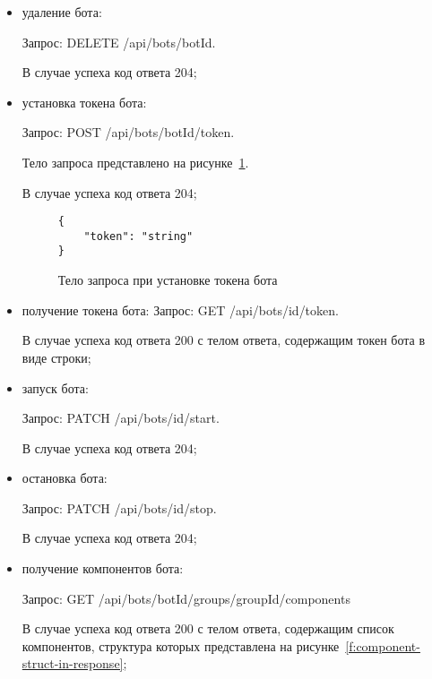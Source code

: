 \begin{itemize}
	\item удаление бота:

	      Запрос: DELETE /api/bots/{botId}.

	      В случае успеха код ответа 204;

	\item установка токена бота:

	      Запрос: POST /api/bots/{botId}/token.

	      Тело запроса представлено на рисунке~\ref{f:set-token-request-body}.

	      В случае успеха код ответа 204;


	      \begin{figure}[ht]
		      \centering
		      \vspace{\toppaddingoffigure}
		      \begin{lstlisting}
{
    "token": "string"
}
    \end{lstlisting}
		      \caption{Тело запроса при установке токена бота}
		      \label{f:set-token-request-body}
	      \end{figure}


	\item получение токена бота:
	      Запрос: GET /api/bots/{id}/token.

	      В случае успеха код ответа 200 с телом ответа, содержащим токен бота
	      в виде строки;

	\item запуск бота:

	      Запрос: PATCH /api/bots/{id}/start.

	      В случае успеха код ответа 204;

	\item остановка бота:

	      Запрос: PATCH /api/bots/{id}/stop.

	      В случае успеха код ответа 204;

	\item получение компонентов бота:

	      Запрос: GET /api/bots/{botId}/groups/{groupId}/components

	      В случае успеха код ответа 200 с телом ответа, содержащим список
	      компонентов, структура которых представлена
	      на рисунке~\ref{f:component-struct-in-response};



\end{itemize}
